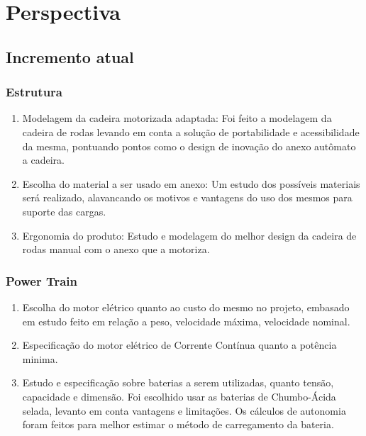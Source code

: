 \chapter[Perspectiva]{Perspectiva}

\section{Incremento atual}
  \subsection{Estrutura}
    \begin{enumerate}
      \item Modelagem da cadeira motorizada adaptada: Foi feito a modelagem da cadeira de rodas levando em conta a solução de portabilidade e acessibilidade da mesma, pontuando pontos como o design de inovação do anexo autômato a cadeira.

      \item Escolha do material a ser usado em anexo: Um estudo dos possíveis materiais será realizado, alavancando os motivos e vantagens do uso dos mesmos para suporte das cargas.

      \item Ergonomia do produto: Estudo e modelagem do melhor design da cadeira de rodas manual com o anexo que a motoriza.
    \end{enumerate}
  \subsection{Power Train}
    \begin{enumerate}
      \item Escolha do motor elétrico quanto ao custo do mesmo no projeto, embasado em estudo feito em relação a peso, velocidade máxima, velocidade nominal.
      \item Especificação do motor elétrico de Corrente Contínua quanto a potência minima.
      \item Estudo e especificação sobre baterias a serem utilizadas, quanto tensão, capacidade e dimensão. Foi escolhido usar as baterias de Chumbo-Ácida selada, levanto em conta vantagens e limitações. Os cálculos de autonomia foram feitos para melhor estimar o método de carregamento da bateria.
    \end{enumerate}

